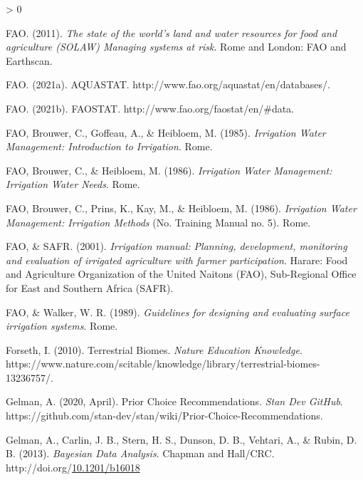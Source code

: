 \documentclass[12pt,twoside]{reedthesis}
\newlength{\cslhangindent}
\newenvironment{CSLReferences}[2] %
 {%
  \setlength{\parindent}{0pt}
  \ifodd #1 \everypar{\setlength{\hangindent}{\cslhangindent}}\ignorespaces\fi
  \ifnum #2 > 0
  \setlength{\parskip}{#2\baselineskip}
  \fi
 }%
 {}
\begin{document}
\begin{CSLReferences}{1}{0}
\leavevmode\hypertarget{ref-faoStateWorldLand2011}{}%
FAO. (2011). \emph{The state of the world's land and water resources for food and agriculture ({SOLAW}) {} {Managing} systems at risk}. {Rome and London}: {FAO and Earthscan}.

\leavevmode\hypertarget{ref-faoAQUASTAT2021}{}%
FAO. (2021a). {AQUASTAT}. http://www.fao.org/aquastat/en/databases/.

\leavevmode\hypertarget{ref-faoFAOSTAT2021}{}%
FAO. (2021b). {FAOSTAT}. http://www.fao.org/faostat/en/\#data.

\leavevmode\hypertarget{ref-faoIrrigationWaterManagement1985}{}%
FAO, Brouwer, C., Goffeau, A., \& Heibloem, M. (1985). \emph{Irrigation {Water Management}: Introduction to {Irrigation}}. {Rome}.

\leavevmode\hypertarget{ref-faoIrrigationWaterManagement1986a}{}%
FAO, Brouwer, C., \& Heibloem, M. (1986). \emph{Irrigation {Water Management}: Irrigation {Water Needs}}. {Rome}.

\leavevmode\hypertarget{ref-faoIrrigationWaterManagement1986}{}%
FAO, Brouwer, C., Prins, K., Kay, M., \& Heibloem, M. (1986). \emph{Irrigation {Water Management}: Irrigation {Methods}} (No. Training Manual no. 5). {Rome}.

\leavevmode\hypertarget{ref-faoIrrigationManualPlanning2001}{}%
FAO, \& SAFR. (2001). \emph{Irrigation manual: Planning, development, monitoring and evaluation of irrigated agriculture with farmer participation}. {Harare}: {Food and Agriculture Organization of the United Naitons (FAO), Sub-Regional Office for East and Southern Africa (SAFR)}.

\leavevmode\hypertarget{ref-faoGuidelinesDesigningEvaluating1989}{}%
FAO, \& Walker, W. R. (1989). \emph{Guidelines for designing and evaluating surface irrigation systems}. {Rome}.

\leavevmode\hypertarget{ref-forsethTerrestrialBiomes2010}{}%
Forseth, I. (2010). Terrestrial {Biomes}. \emph{Nature Education Knowledge}. https://www.nature.com/scitable/knowledge/library/terrestrial-biomes-13236757/.

\leavevmode\hypertarget{ref-gelmanPriorChoiceRecommendations2020}{}%
Gelman, A. (2020, April). Prior {Choice Recommendations}. \emph{Stan Dev GitHub}. https://github.com/stan-dev/stan/wiki/Prior-Choice-Recommendations.

\leavevmode\hypertarget{ref-gelmanBayesianDataAnalysis2013}{}%
Gelman, A., Carlin, J. B., Stern, H. S., Dunson, D. B., Vehtari, A., \& Rubin, D. B. (2013). \emph{Bayesian {Data Analysis}}. {Chapman and Hall/CRC}. http://doi.org/\href{https://doi.org/10.1201/b16018}{10.1201/b16018}


\end{CSLReferences}
\end{document}
